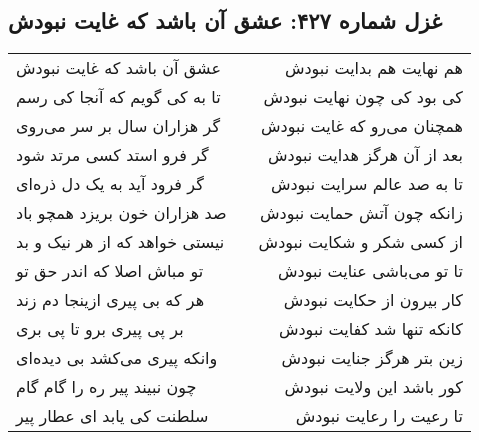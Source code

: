 \begin{center}
\section*{غزل شماره ۴۲۷: عشق آن باشد که غایت نبودش}
\label{sec:427}
\begin{longtable}{l p{0.5cm} r}
عشق آن باشد که غایت نبودش
&&
هم نهایت هم بدایت نبودش
\\
تا به کی گویم که آنجا کی رسم
&&
کی بود کی چون نهایت نبودش
\\
گر هزاران سال بر سر می‌روی
&&
همچنان می‌رو که غایت نبودش
\\
گر فرو استد کسی مرتد شود
&&
بعد از آن هرگز هدایت نبودش
\\
گر فرود آید به یک دل ذره‌ای
&&
تا به صد عالم سرایت نبودش
\\
صد هزاران خون بریزد همچو باد
&&
زانکه چون آتش حمایت نبودش
\\
نیستی خواهد که از هر نیک و بد
&&
از کسی شکر و شکایت نبودش
\\
تو مباش اصلا که اندر حق تو
&&
تا تو می‌باشی عنایت نبودش
\\
هر که بی پیری ازینجا دم زند
&&
کار بیرون از حکایت نبودش
\\
بر پی پیری برو تا پی بری
&&
کانکه تنها شد کفایت نبودش
\\
وانکه پیری می‌کشد بی دیده‌ای
&&
زین بتر هرگز جنایت نبودش
\\
چون نبیند پیر ره را گام گام
&&
کور باشد این ولایت نبودش
\\
سلطنت کی یابد ای عطار پیر
&&
تا رعیت را رعایت نبودش
\\
\end{longtable}
\end{center}
